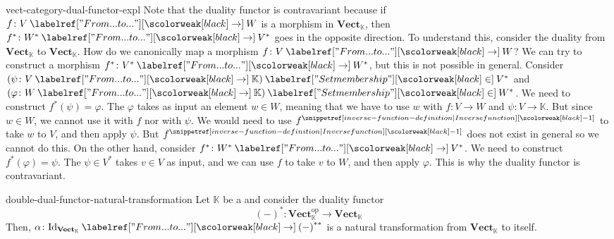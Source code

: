 \documentclass[preview]{standalone}
\begin{document}
\begin{snippet}{vect-category-dual-functor-expl}
    Note that the duality functor is contravariant because
    if \(f \colon V \fromto W\) is a morphism in \(\mathbf{Vect}_\mathbb{K}\),
    then \(f^* \colon W^* \fromto V^*\) goes in the opposite direction.
    To understand this, consider the duality \functor from \(\mathbf{Vect}_\mathbb{K}\) to \(\mathbf{Vect}_\mathbb{K}\).
    How do we canonically map a morphism \(f \colon V \fromto W\)?
    We can try to construct a morphism \(f^* \colon V^* \fromto W^*\),
    but this is not possible in general.
    Consider \((\psi \colon V \fromto \mathbb{K}) \in V^*\) and
    \((\varphi \colon W \fromto \mathbb{K}) \in W^*\).
    We need to construct \(f^*(\psi) = \varphi\).
    The \function \(\varphi\) takes as input an element \(w \in W\),
    meaning that we have to use \(w\) with \(f \colon V \to W\) and \(\psi \colon V \to \mathbb{K}\).
    But since \(w\in W\), we cannot use it with \(f\) nor with \(\psi\).
    We would need to use \(f^\inversefunction\) to take \(w\) to \(V\), and then apply \(\psi\).
    But \(f^\inversefunction\) does not exist in general so we cannot do this.
    On the other hand, consider \(f^* \colon W^* \fromto V^*\).
    We need to construct \(f^*(\varphi) = \psi\).
    The \function \(\psi \in V^*\) takes \(v\in V\) as input,
    and we can use \(f\) to take \(v\) to \(W\),
    and then apply \(\varphi\).
    This is why the duality functor is contravariant.
\end{snippet}

\begin{snippetproposition}{double-dual-functor-natural-transformation}{}
    Let \(\mathbb{K}\) be a \field and consider the duality functor
    \[
        {(-)}^* \colon \mathbf{Vect}_\mathbb{K}^\text{op} \to \mathbf{Vect}_\mathbb{K}
    \]
    Then, \(\alpha \colon \text{Id}_{\mathbf{Vect}_\mathbb{K}} \fromto {(-)}^{**}\)
    is a natural transformation from \(\mathbf{Vect}_\mathbb{K}\) to itself.
\end{snippetproposition}
\end{document}
